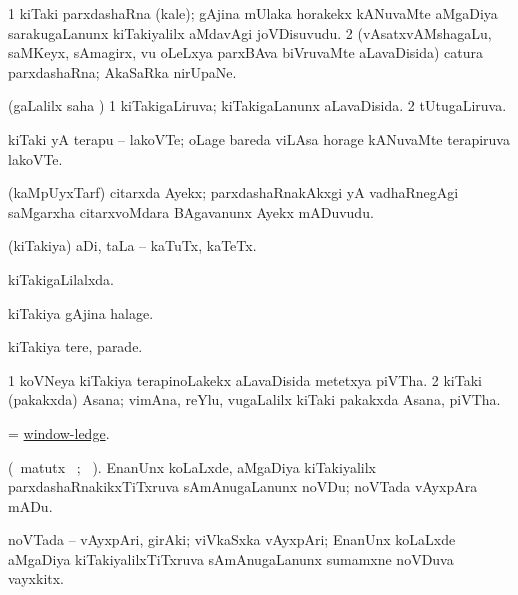 \bentry
{}
\gl{\nA}
\bmng
\bnum
\num{1} kiTaki parxdashaRna (kale); gAjina mUlaka horakekx kANuvaMte aMgaDiya sarakugaLanunx kiTakiyalilx aMdavAgi joVDisuvudu. 
\num{2} (vAsatxvAMshagaLu, saMKeyx, sAmagirx, \mo vu oLeLxya parxBAva biVruvaMte aLavaDisida) catura parxdashaRna; AkaSaRka nirUpaNe. 
\enum
\emng
\eentry

\bentry
{}
\gl{\gu}
\bmng
(\saMpa gaLalilx saha \parx) 
\bnum
\num{1} kiTakigaLiruva; kiTakigaLanunx aLavaDisida. 
\num{2} tUtugaLiruva. 
\enum
\emng
\eentry

\bentry
{}
\gl{\nA}
\bmng
kiTaki yA terapu -- lakoVTe; oLage bareda viLAsa horage kANuvaMte terapiruva lakoVTe. 
\emng
\eentry

\bentry
{}
\gl{\nA}
\bmng
(kaMpUyxTarf) citarxda Ayekx; parxdashaRnakAkxgi yA vadhaRnegAgi saMgarxha citarxvoMdara BAgavanunx Ayekx mADuvudu. 
\emng
\eentry

\bentry
{}
\gl{\nA}
\bmng
(kiTakiya) aDi, taLa -- kaTuTx, kaTeTx. 
\emng
\eentry

\bentry
{}
\gl{\gu}
\bmng
kiTakigaLilalxda. 
\emng
\eentry

\bentry
{}
\gl{\nA}
\bmng
kiTakiya gAjina halage. 
\emng
\eentry

\bentry
{}
\gl{\nA}
\bmng
kiTakiya tere, parade. 
\emng
\eentry

\bentry
{}
\gl{\nA}
\bmng
\bnum
\num{1} koVNeya kiTakiya terapinoLakekx aLavaDisida metetxya piVTha. 
\num{2} kiTaki (pakakxda) Asana; vimAna, reYlu, \mo vugaLalilx kiTaki pakakxda Asana, piVTha. 
\enum
\emng
\eentry

\bentry
{}
\gl{\nA}
\bmng
= \hyperlink{window-ledge}{window-ledge}. 
\emng
\eentry

\bentry
{}
\gl{\sakirx} (\BU\ matutx \BUkaq\ ; \vakaq\ ). 
\bmng
EnanUnx koLaLxde, aMgaDiya kiTakiyalilx parxdashaRnakikxTiTxruva sAmAnugaLanunx noVDu; noVTada vAyxpAra mADu. 
\emng
\eentry

\bentry
{}
\gl{\nA}
\bmng
noVTada -- vAyxpAri, girAki; viVkaSxka vAyxpAri; EnanUnx koLaLxde aMgaDiya kiTakiyalilxTiTxruva sAmAnugaLanunx sumamxne noVDuva vayxkitx. 
\emng
\eentry

